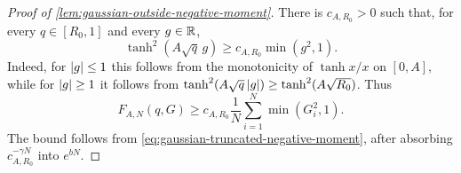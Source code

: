\documentclass[11pt,reqno,a4paper]{article}
\begin{document}
\begin{proof}[Proof of \cref{lem:gaussian-outside-negative-moment}]
  There is $c_{A,R_0}>0$ such that, for every $q\in[R_0,1]$ and every
  $g\in\mathbb{R}$,
  \begin{equation}\label{eq:gaussian-outside-pointwise-lower}
    \tanh^2(A\sqrt q\,g)
    \geq
    c_{A,R_0}\min(g^2,1).
  \end{equation}
  Indeed, for $\abs g\leq1$ this follows from the monotonicity of
  $\tanh x/x$ on $[0,A]$, while for $\abs g\geq1$ it follows from
  $\tanh^2(A\sqrt q\,\abs g)\geq\tanh^2(A\sqrt{R_0})$. Thus
  \begin{equation*}
    F_{A,N}(q,G)
    \geq
    c_{A,R_0}
    \frac1N\sum_{i=1}^N\min(G_i^2,1).
  \end{equation*}
  The bound follows from
  \cref{eq:gaussian-truncated-negative-moment}, after absorbing
  $c_{A,R_0}^{-\gamma N}$ into $e^{bN}$.
\end{proof}
\end{document}
